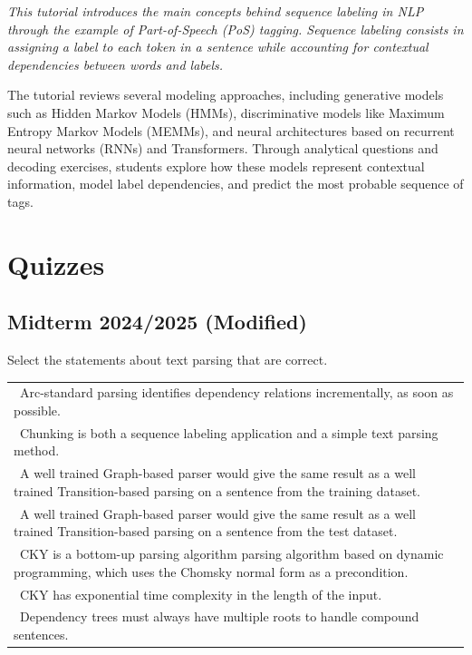\documentclass{../extra/aakpract/aakpract}
\begin{document}
	
	\maketitle
	
	\begin{center}
		\begin{minipage}{0.85\textwidth}
			\small\itshape
			This tutorial introduces the main concepts behind sequence labeling in NLP through the example of Part-of-Speech (PoS) tagging. 
			Sequence labeling consists in assigning a label to each token in a sentence while accounting for contextual dependencies between words and labels.
			
			\vspace{6pt}
			The tutorial reviews several modeling approaches, including generative models such as Hidden Markov Models (HMMs), discriminative models like Maximum Entropy Markov Models (MEMMs), and neural architectures based on recurrent neural networks (RNNs) and Transformers. 
			Through analytical questions and decoding exercises, students explore how these models represent contextual information, model label dependencies, and predict the most probable sequence of tags.
			
		\end{minipage}
	\end{center}
	
	\section{Quizzes}
	
	\subsection{Midterm 2024/2025 (Modified)}
	
	Select the statements about text parsing that are correct. 
	
	\begin{longtable}{|p{}|}
		\hline 
		\Square\ Arc-standard parsing identifies dependency relations incrementally, as soon as possible.\\
		\Square\ Chunking is both a sequence labeling application and a simple text parsing method.\\
		\Square\ A well trained Graph-based parser would give the same result as a well trained Transition-based parsing on a sentence from the training dataset.  \\
		\Square\ A well trained Graph-based parser would give the same result as a well trained Transition-based parsing on a sentence from the test dataset. \\
		\Square\ CKY is a bottom-up parsing algorithm parsing algorithm based on dynamic programming,  which uses the Chomsky normal form as a precondition. \\
		\Square\ CKY has exponential time complexity in the length of the input.\\
		\Square\ Dependency trees must always have multiple roots to handle compound sentences.\\
		\hline
	\end{longtable}
	
\end{document}
